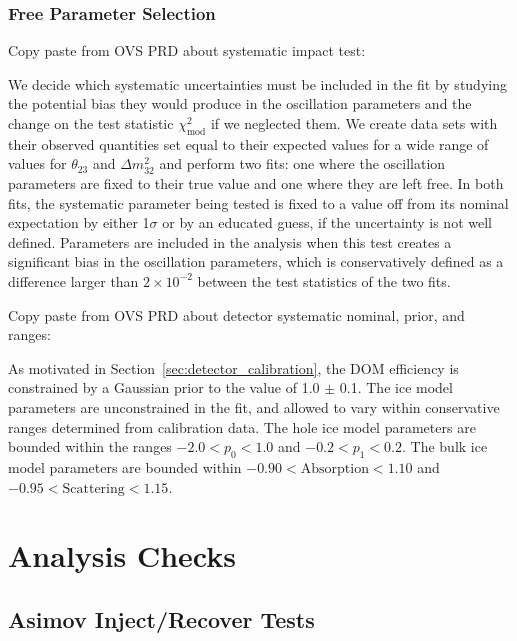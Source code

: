\subsubsection{Free Parameter Selection} 

Copy paste from OVS PRD about systematic impact test:

We decide which systematic uncertainties must be included in the fit by studying the potential bias they would produce in the oscillation parameters and the change on the test statistic $\chi^2_\mathrm{mod}$ if we neglected them. We create data sets with their observed quantities set equal to their expected values for a wide range of values for $\theta_{23}$ and $\Delta m^{2}_{32}$ and perform two fits: one where the oscillation parameters are fixed to their true value and one where they are left free. In both fits, the systematic parameter being tested is fixed to a value off from its nominal expectation by either 1$\sigma$ or by an educated guess, if the uncertainty is not well defined. Parameters are included in the analysis when this test creates a significant bias in the oscillation parameters, which is conservatively defined as a difference larger than $2\times10^{-2}$ between the test statistics of the two fits.

Copy paste from OVS PRD about detector systematic nominal, prior, and ranges:

As motivated in Section~\ref{sec:detector_calibration}, the DOM efficiency is constrained by a Gaussian prior to the value of 1.0 $\pm$ 0.1. The ice model parameters are unconstrained in the fit, and allowed to vary within conservative ranges determined from calibration data. The hole ice model parameters are bounded within the ranges $-2.0<p_{0}<1.0$ and $-0.2<p_{1}<0.2$. The bulk ice model parameters are bounded within $-0.90 < \mathrm{Absorption} < 1.10$ and $-0.95 < \mathrm{Scattering} < 1.15$.


\section{Analysis Checks}

\subsection{Asimov Inject/Recover Tests}

